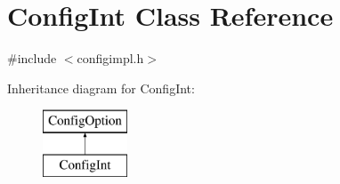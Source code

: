 \hypertarget{class_config_int}{}\section{Config\+Int Class Reference}
\label{class_config_int}


{\ttfamily \#include $<$configimpl.\+h$>$}

Inheritance diagram for Config\+Int\+:\begin{figure}[H]
\begin{center}
\leavevmode
\includegraphics[height=2.000000cm]{class_config_int}
\end{center}
\end{figure}
